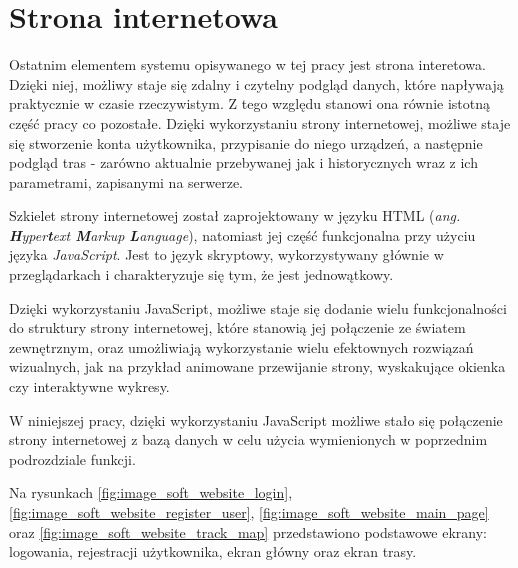 \section{Strona internetowa}
\lstset{language=HTML, inputencoding=utf8, breaklines=true}

Ostatnim elementem systemu opisywanego w tej pracy jest strona interetowa. Dzięki niej, możliwy staje się zdalny i czytelny podgląd danych, które napływają praktycznie w czasie rzeczywistym. Z tego względu stanowi ona równie istotną część pracy co pozostałe. Dzięki wykorzystaniu strony internetowej, możliwe staje się stworzenie konta użytkownika, przypisanie do niego urządzeń, a następnie podgląd tras - zarówno aktualnie przebywanej jak i historycznych wraz z ich parametrami, zapisanymi na serwerze.

Szkielet strony internetowej został zaprojektowany w języku HTML (\textit{ang. \textbf{H}yper\textbf{t}ext \textbf{M}arkup \textbf{L}anguage}), natomiast jej część funkcjonalna przy użyciu języka \textit{JavaScript}. Jest to język skryptowy, wykorzystywany głównie w przeglądarkach i charakteryzuje się tym, że jest jednowątkowy.

Dzięki wykorzystaniu JavaScript, możliwe staje się dodanie wielu funkcjonalności do struktury strony internetowej, które stanowią jej połączenie ze światem zewnętrznym, oraz umożliwiają wykorzystanie wielu efektownych rozwiązań wizualnych, jak na przykład animowane przewijanie strony, wyskakujące okienka czy interaktywne wykresy.

W niniejszej pracy, dzięki wykorzystaniu JavaScript możliwe stało się połączenie strony internetowej z bazą danych w celu użycia wymienionych w poprzednim podrozdziale funkcji.  

Na rysunkach \ref{fig:image_soft_website_login}, \ref{fig:image_soft_website_register_user}, \ref{fig:image_soft_website_main_page} oraz \ref{fig:image_soft_website_track_map} przedstawiono podstawowe ekrany: logowania, rejestracji użytkownika, ekran główny oraz ekran trasy.

